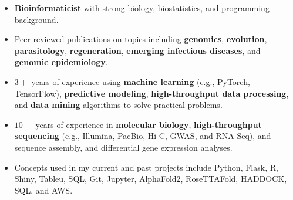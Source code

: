 \documentclass[11pt, letterpaper, sans]{moderncv}
\begin{document}
\thispagestyle{empty}\maketitle


\vspace{-3em}

\begin{itemize}

\item \textbf{Bioinformaticist} with strong biology, biostatistics, and programming background.

\item Peer-reviewed publications on topics including \textbf{genomics}, \textbf{evolution}, \textbf{parasitology}, \textbf{regeneration}, \textbf{emerging infectious diseases}, and \textbf{genomic epidemiology}.

\item $3+$ years of experience using \textbf{machine learning} (e.g., PyTorch, TensorFlow), \textbf{predictive modeling}, \textbf{high-throughput data processing}, and \textbf{data mining} algorithms to solve practical problems.

\item $10+$ years of experience in \textbf{molecular biology}, \textbf{high-throughput sequencing} (e.g., Illumina, PacBio, Hi-C, GWAS, and RNA-Seq), and sequence assembly, and differential gene expression analyses.

\item Concepts used in my current and past projects include Python, Flask, R, Shiny, Tableu, SQL, Git, Jupyter, AlphaFold2, RoseTTAFold, HADDOCK, SQL, and AWS.

\end{itemize}


\vspace{-0.5em}
\end{document}
